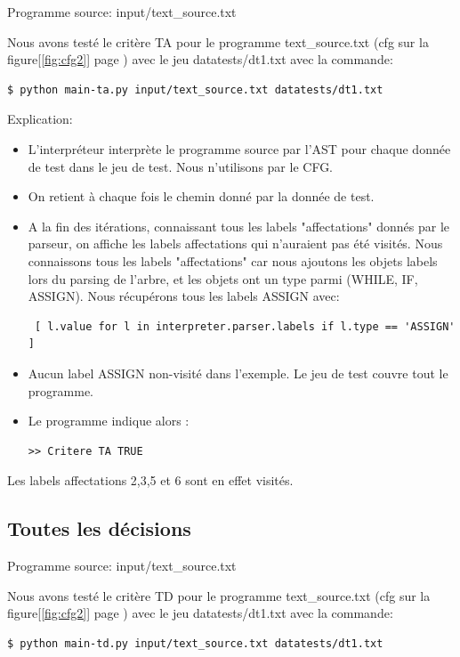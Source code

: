 \documentclass[a4paper]{article}
\begin{document}
Programme source: input/text\_source.txt

Nous avons testé le critère TA pour le programme text\_source.txt (cfg sur la figure[\ref{fig:cfg2}] page \pageref{fig:cfg2}) avec le jeu datatests/dt1.txt avec la commande:

\begin{verbatim}
$ python main-ta.py input/text_source.txt datatests/dt1.txt
\end{verbatim}

Explication: 
\begin{itemize}
\item L'interpréteur interprète le programme source par l'AST pour chaque donnée de test dans le jeu de test. Nous n'utilisons par le CFG.
\item On retient à chaque fois le chemin donné par la donnée de test.
\item A la fin des itérations, connaissant tous les labels "affectations" donnés par le parseur, on affiche les labels affectations qui n'auraient pas été visités. Nous connaissons tous les labels "affectations" car nous ajoutons les objets labels lors du parsing de l'arbre, et les objets ont un type parmi (WHILE, IF, ASSIGN). Nous récupérons tous les labels ASSIGN avec: 
\begin{verbatim} [ l.value for l in interpreter.parser.labels if l.type == 'ASSIGN' ] \end{verbatim}
\item Aucun label ASSIGN non-visité dans l'exemple. Le jeu de test couvre tout le programme. 
\item Le programme indique alors :
\begin{verbatim}
>> Critere TA TRUE
\end{verbatim}
\end{itemize}

Les labels affectations 2,3,5 et 6 sont en effet visités. 

\subsection{Toutes les décisions}

Programme source: input/text\_source.txt

Nous avons testé le critère TD pour le programme text\_source.txt (cfg sur la figure[\ref{fig:cfg2}] page \pageref{fig:cfg2}) avec le jeu datatests/dt1.txt avec la commande:

\begin{verbatim}
$ python main-td.py input/text_source.txt datatests/dt1.txt
\end{verbatim}
\end{document}
